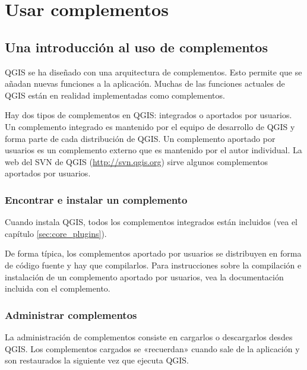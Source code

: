 \section{Usar complementos}

\subsection{Una introducción al uso de complementos}\label{label_introplugin}

QGIS se ha diseñado con una arquitectura de complementos. Esto permite que se añadan nuevas funciones a la aplicación. Muchas de las funciones actuales de QGIS están en realidad implementadas como complementos.

Hay dos tipos de complementos en QGIS: integrados o aportados por usuarios.  Un complemento integrado es mantenido por el equipo de desarrollo de QGIS y forma parte de cada distribución de QGIS. Un complemento aportado por usuarios es un complemento externo que es mantenido por el autor individual. La web del SVN de QGIS (\url{http://svn.qgis.org}) sirve algunos complementos aportados por usuarios.

\subsubsection{Encontrar e instalar un complemento}
Cuando instala QGIS, todos los complementos integrados están incluidos (vea el capítulo \ref{sec:core_plugins}). 

De forma típica, los complementos aportado por usuarios se distribuyen en forma de código fuente y hay que compilarlos. Para instrucciones sobre la compilación e instalación de un complemento aportado por usuarios, vea la documentación incluida con el complemento.

\subsubsection{Administrar complementos}\label{sec:managing_plugins}
 La administración de complementos consiste en cargarlos o descargarlos desdes QGIS. Los complementos cargados se «recuerdan» cuando sale de la aplicación y son restaurados la siguiente vez que ejecuta  QGIS.

